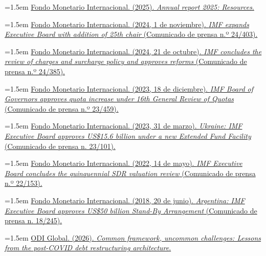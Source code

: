 \documentclass[10pt,a4paper]{article}
\begin{document}
\noindent\hangindent=1.5em \href{https://www.imf.org/external/pubs/ft/ar/2025/who-we-are/resources/}{Fondo Monetario Internacional. (2025). \textit{Annual report 2025: Resources}.}

\noindent\hangindent=1.5em \href{https://www.imf.org/en/news/articles/2024/11/01/pr-24403-imf-expands-executive-board-with-addition-of-25th-chair}{Fondo Monetario Internacional. (2024, 1 de noviembre). \textit{IMF expands Executive Board with addition of 25th chair} (Comunicado de prensa n.º 24/403).}

\noindent\hangindent=1.5em \href{https://www.imf.org/en/news/articles/2024/10/21/pr-24385-imf-concludes-the-review-of-charges-and-surcharge-policy-and-approves-reforms}{Fondo Monetario Internacional. (2024, 21 de octubre). \textit{IMF concludes the review of charges and surcharge policy and approves reforms} (Comunicado de prensa n.º 24/385).}

\noindent\hangindent=1.5em \href{https://www.imf.org/en/News/Articles/2023/12/18/pr23459-imf-board-governors-approves-quota-increase-under-16th-general-review-quotas}{Fondo Monetario Internacional. (2023, 18 de diciembre). \textit{IMF Board of Governors approves quota increase under 16th General Review of Quotas} (Comunicado de prensa n.º 23/459).}

\noindent\hangindent=1.5em \href{https://www.imf.org/en/news/articles/2023/03/31/pr23101-ukraine-imf-executive-board-approves-usd-billion-new-eff-part-of-overall-support-package}{Fondo Monetario Internacional. (2023, 31 de marzo). \textit{Ukraine: IMF Executive Board approves US\$15.6 billion under a new Extended Fund Facility} (Comunicado de prensa n.\textordmasculine{} 23/101).}

\noindent\hangindent=1.5em \href{https://www.imf.org/en/news/articles/2022/05/14/pr22153-imf-board-concludes-sdr-valuation-review}{Fondo Monetario Internacional. (2022, 14 de mayo). \textit{IMF Executive Board concludes the quinquennial SDR valuation review} (Comunicado de prensa n.º 22/153).}

\noindent\hangindent=1.5em \href{https://www.imf.org/en/news/articles/2018/06/20/pr18245-argentina-imf-executive-board-approves-us50-billion-stand-by-arrangement}{Fondo Monetario Internacional. (2018, 20 de junio). \textit{Argentina: IMF Executive Board approves US\$50 billion Stand-By Arrangement} (Comunicado de prensa n.\textordmasculine{} 18/245).}

\noindent\hangindent=1.5em \href{https://odi.org/en/insights/common-framework-uncommon-challenges-lessons-from-the-post-covid-debt-restructuring-architecture/}{ODI Global. (2026). \textit{Common framework, uncommon challenges: Lessons from the post-COVID debt restructuring architecture}.}
\end{document}

